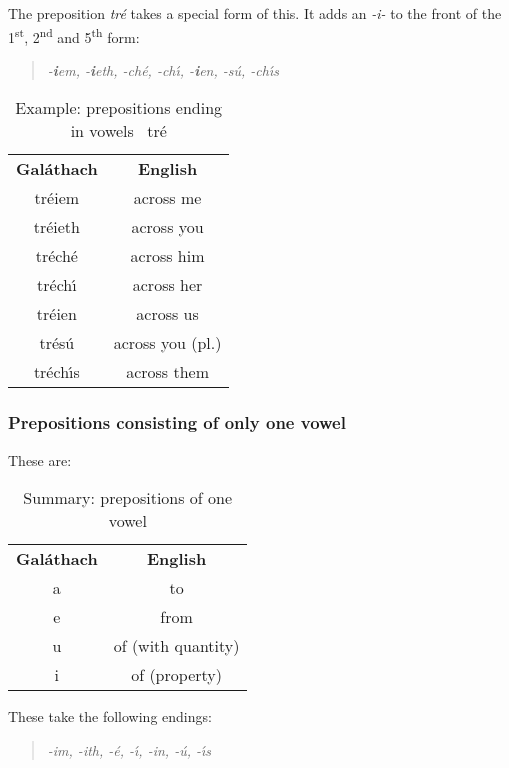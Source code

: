 The preposition \textit{tr\'{e}} takes a special form of this. It adds an \textit{-i-} to the front of the 1\textsuperscript{st}, 2\textsuperscript{nd} and 5\textsuperscript{th} form:
\begin{quote}
\textit{-\textbf{i}em, -\textbf{i}eth, -ch\'{e}, -ch\'{\i}, -\textbf{i}en, -s\'{u}, -ch\'{\i}s}
\end{quote}

\begin{table}[H]
\centering
\begin{tabular}{cc}
  \toprule
  \textbf{Gal\'{a}thach} & \textbf{English}\\
  \cmidrule(lr){1-1}\cmidrule(lr){2-2}
  tr\'{e}iem & across me\\
  tr\'{e}ieth & across you\\
  tr\'{e}ch\'{e} & across him\\
  tr\'{e}ch\'{\i} & across her\\
  tr\'{e}ien & across us\\
  tr\'{e}s\'{u} & across you (pl.)\\
  tr\'{e}ch\'{\i}s & across them\\
  \bottomrule
\end{tabular}
\caption{Example: prepositions ending in vowels \textendash\ tr\'{e}}
\label{example_prepositions_ending_in_vowels_tre}
\end{table}

\subsubsection{Prepositions consisting of only one vowel}

These are:
\begin{table}[H]
\centering
\begin{tabular}{cc}
  \toprule
  \textbf{Gal\'{a}thach} & \textbf{English}\\
  \cmidrule(lr){1-1}\cmidrule(lr){2-2}
  a & to\\
  e & from\\
  u & of (with quantity)\\
  i & of (property)\\
  \bottomrule
\end{tabular}
\caption{Summary: prepositions of one vowel}
\label{summary_prepositions_of_one_vowel}
\end{table}

These take the following endings:
\begin{quote}
\textit{-im, -ith, -\'{e}, -\'{\i}, -in, -\'{u}, -\'{\i}s}
\end{quote}

